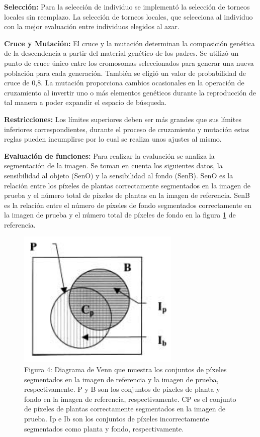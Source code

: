 \documentclass[conference,compsoc]{IEEEtran}
\begin{document}
\textbf{Selección:} Para la selección de individuo se implementó la selección de torneos locales sin reemplazo. La selección de torneos locales, que selecciona al individuo con la mejor evaluación entre individuos elegidos al azar.

\textbf{Cruce y Mutación:} El cruce y la mutación determinan la composición genética de la descendencia a partir del material genético de los padres. Se utilizó un punto de cruce único entre los cromosomas seleccionados para generar una nueva población para cada generación. También se eligió un valor de probabilidad de cruce de 0,8. La mutación proporciona cambios ocasionales en la operación de cruzamiento al invertir uno o más elementos genéticos durante la reproducción de tal manera a poder expandir el espacio de búsqueda. 

\textbf{Restricciones:} Los límites superiores deben ser más grandes que sus límites inferiores correspondientes, durante el proceso de cruzamiento y mutación estas reglas pueden incumplirse por lo cual se realiza unos ajustes al mismo.

\textbf{Evaluación de funciones:} Para realizar la evaluación se analiza la segmentación de la imagen. Se toman en cuenta los siguientes datos, la sensibilidad al objeto (SenO) y la sensibilidad al fondo (SenB). SenO es la relación entre los píxeles de plantas correctamente segmentados en la imagen de prueba y el número total de píxeles de plantas en la imagen de referencia. SenB es la relación entre el número de píxeles de fondo segmentados correctamente en la imagen de prueba y el número total de píxeles de fondo en la figura \ref{fig:diagben} de referencia.

\begin{figure}[H]
\centering
\includegraphics[scale=0.5]{diagben.png}
\caption{\label{fig:diagben}Figura 4: Diagrama de Venn que muestra los conjuntos de píxeles segmentados en la imagen de referencia y la imagen de prueba, respectivamente. P y B son los conjuntos de píxeles de planta y fondo en la imagen de referencia, respectivamente. CP es el conjunto de píxeles de plantas correctamente segmentados en la imagen de prueba. Ip e Ib son los conjuntos de píxeles incorrectamente segmentados como planta y fondo, respectivamente.}
\end{figure}
\end{document}
